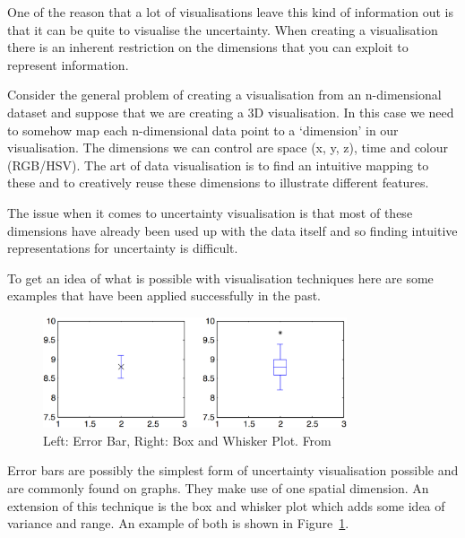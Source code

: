 One of the reason that a lot of visualisations leave this kind of information out is that it can be quite to visualise the uncertainty. When creating a visualisation there is an inherent restriction on the dimensions that you can exploit to represent information.

Consider the general problem of creating a visualisation from an n-dimensional dataset and suppose that we are creating a 3D visualisation. In this case we need to somehow map each n-dimensional data point to a ‘dimension’ in our visualisation. The dimensions we can control are space (x, y, z), time and colour (RGB/HSV). The art of data visualisation is to find an intuitive mapping to these and to creatively reuse these dimensions to illustrate different features.

The issue when it comes to uncertainty visualisation is that most of these dimensions have already been used up with the data itself and so finding intuitive representations for uncertainty is difficult.

To get an idea of what is possible with visualisation techniques here are some examples that have been applied successfully in the past.

\begin{figure}[h]
    \centering
	\includegraphics[width=0.8\textwidth]{images/error_bars.png}
    \caption{Left: Error Bar, Right: Box and Whisker Plot. From \cite{uncertaintyoverview}}
    \label{fig:error_bars}
\end{figure}

Error bars are possibly the simplest form of uncertainty visualisation possible and are commonly found on graphs. They make use of one spatial dimension. An extension of this technique is the box and whisker plot which adds some idea of variance and range. An example of both is shown in Figure~\ref{fig:error_bars}.


